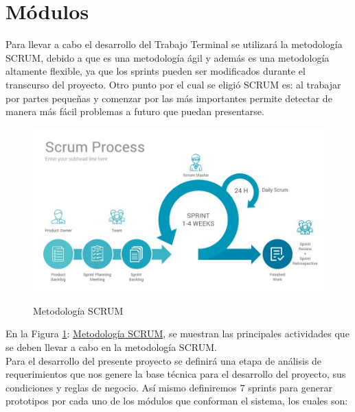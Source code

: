 \section{Módulos}
Para llevar a cabo el desarrollo del Trabajo Terminal se utilizará la metodología SCRUM, debido a que es una metodología ágil y además es una metodología altamente flexible, ya que los sprints pueden ser modificados durante el transcurso del proyecto. Otro punto por el cual se eligió SCRUM es: al trabajar por partes pequeñas y comenzar por las más importantes permite detectar de manera más fácil problemas a futuro que puedan presentarse. \cite{scrum}

\begin{figure}[htbp]
	\begin{center}
		\hypertarget{fig:metodologiaScrum}{
			\includegraphics[scale=.4]{propuestaSolicion/turismo/images/metodologiaScrum}
			\caption{Metodología SCRUM}
		}
		\label{fig:metodologiaScrum}
	\end{center}
\end{figure}

En la Figura \ref{fig:metodologiaScrum}: \hyperlink{fig:metodologiaScrum}{Metodología SCRUM}, se muestran las principales actividades que se deben llevar a cabo en la metodología SCRUM. \\

Para el desarrollo del presente proyecto se definirá una etapa de análisis de requerimientos que nos genere la base técnica para el desarrollo del proyecto, sus condiciones y reglas de negocio. Así mismo definiremos 7 sprints para generar prototipos por cada uno de los módulos que conforman el sistema, los cuales son: \\

